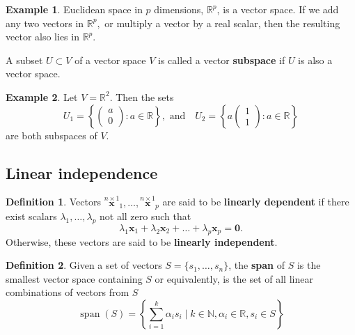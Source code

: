 \documentclass[
]{book}
\theoremstyle{definition}
\newtheorem{definition}{Definition}[chapter]
\theoremstyle{definition}
\newtheorem{example}{Example}[chapter]
\theoremstyle{definition}
\theoremstyle{definition}
\theoremstyle{remark}
\begin{document}
\begin{example}
\protect\hypertarget{exm:Rp}{}\label{exm:Rp}Euclidean space in \(p\) dimensions, \(\mathbb{R}^p\), is a vector space. If we add any two vectors in \(\mathbb{R}^p,\) or multiply a vector by a real scalar, then the resulting vector also lies in \(\mathbb{R}^p\).
\end{example}

A subset \(U \subset V\) of a vector space \(V\) is called a vector \textbf{subspace} if \(U\) is also a vector space.

\begin{example}
\protect\hypertarget{exm:Rp2}{}\label{exm:Rp2}Let \(V=\mathbb{R}^2\). Then the sets \[U_1 = \left\{\left(
        \begin{array}{c}
        a\\
      0  \end{array}
        \right): a\in \mathbb{R}\right\}, \mbox{ and}\quad U_2 = \left\{a\left(
        \begin{array}{c}
       1 \\
      1  \end{array}
        \right): a\in \mathbb{R}\right\}\]
are both subspaces of \(V\).
\end{example}

\subsection{Linear independence}\label{linear-independence}

\begin{definition}
\protect\hypertarget{def:linindep}{}\label{def:linindep}Vectors \(\stackrel{n\times 1}{\mathbf x}_1 ,\dots , \stackrel{n\times 1}{\mathbf x}_p\)
are said to be \textbf{linearly dependent} if there exist scalars
\(\lambda _1, \dots ,\lambda _p\) not all zero such that
\[ \lambda _1 {\mathbf x}_1+\lambda _2 {\mathbf x}_2+ \dots + \lambda _p {\mathbf x}_p={\mathbf 0}.\]
Otherwise, these vectors are said to be \textbf{linearly independent}.
\end{definition}

\begin{definition}
\protect\hypertarget{def:span}{}\label{def:span}Given a set of vectors \(S=\{s_1, \ldots, s_n\}\), the \textbf{span} of \(S\) is the smallest vector space containing \(S\) or equivalently, is the set of all linear combinations of vectors from \(S\)
\[\operatorname{span}(S) = \left\{ \sum_{i=1}^k \alpha_i s_i \mid k \in \mathbb{N}, \alpha_i \in \mathbb{R}, s_i \in S\right\}\]
\end{definition}
\end{document}
